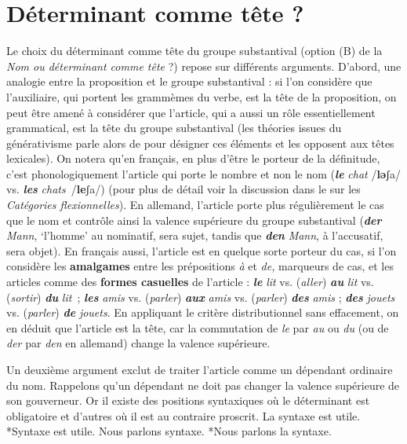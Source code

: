 \section{Déterminant comme tête ?}\label{sec:3.3.26}

Le choix du déterminant comme tête du groupe substantival (option (B) de la  \textit{Nom ou déterminant comme tête} ?) repose sur différents arguments. D’abord, une analogie entre la proposition et le groupe substantival : si l’on considère que l’auxiliaire, qui portent les grammèmes du verbe, est la tête de la proposition, on peut être amené à considérer que l’article, qui a aussi un rôle essentiellement grammatical, est la tête du groupe substantival (les théories issues du générativisme parle alors de  pour désigner ces éléments et les opposent aux têtes lexicales). On notera qu’en français, en plus d’être le porteur de la définitude, c’est phonologiquement l’article qui porte le nombre et non le nom (\textbf{\textit{le}} \textit{chat} /\textbf{lǝ}ʃa/ vs. \textbf{\textit{les}} \textit{chats}~/\textbf{le}ʃa/) (pour plus de détail voir la discussion dans le  sur les \textit{Catégories flexionnelles}). En allemand, l’article porte plus régulièrement le cas que le nom et contrôle ainsi la valence supérieure du groupe substantival (\textbf{\textit{der}} \textit{Mann}, ‘l’homme’ au nominatif, sera sujet, tandis que \textbf{\textit{den}} \textit{Mann}, à l’accusatif, sera objet). En français aussi, l’article est en quelque sorte porteur du cas, si l’on considère les \textbf{amalgames} entre les prépositions \textit{à} et \textit{de,} marqueurs de cas, et les articles comme des \textbf{formes casuelles} de l’article : \textbf{\textit{le}} \textit{lit} vs. (\textit{aller}) \textbf{\textit{au}} \textit{lit} vs. (\textit{sortir}) \textbf{\textit{du}} \textit{lit~}; \textbf{\textit{les}} \textit{amis} vs. (\textit{parler}) \textbf{\textit{aux}} \textit{amis} vs. (\textit{parler}) \textbf{\textit{des}} \textit{amis} ; \textbf{\textit{des}} \textit{jouets} vs. (\textit{parler}) \textbf{\textit{de}} \textit{jouets}. En appliquant le critère distributionnel sans effacement, on en déduit que l’article est la tête, car la commutation de \textit{le} par \textit{au} ou \textit{du} (ou de \textit{der} par \textit{den} en allemand) change la valence supérieure.

Un deuxième argument exclut de traiter l’article comme un dépendant ordinaire du nom. Rappelons qu’un dépendant ne doit pas changer la valence supérieure de son gouverneur. Or il existe des positions syntaxiques où le déterminant est obligatoire et d’autres où il est au contraire proscrit.
\ea
    {La syntaxe est utile.}
\z
\ea
    *{Syntaxe est utile.}
\z
\ea
    {Nous parlons syntaxe.}
\z
\ea
    *{Nous parlons la syntaxe.}
\z

